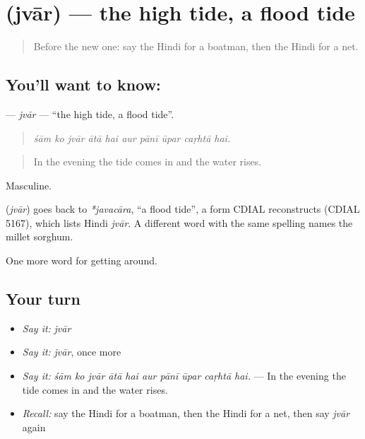 \section[\texorpdfstring{\hi{ज्वार} (jvār)}{ज्वार (jvār)}]{ (jvār) — the high tide, a flood tide}

\label{lesson:HI-C445-jvar}



\begin{quote}
Before the new one: say the Hindi for a boatman, then the Hindi for a net.
\end{quote}

\subsection*{You'll want to know: }
\textbf{} — \emph{jvār} — \textquotedblleft{}the high tide, a flood tide\textquotedblright{}.

\begin{quote}
         
\end{quote}

\begin{quote}
\emph{śām ko jvār ātā hai aur pānī ūpar caṛhtā hai.}
\end{quote}

\begin{quote}
In the evening the tide comes in and the water rises.
\end{quote}

Masculine.

\begin{cousinweb}
\textbf{} (\emph{jvār}) goes back to \emph{*javacāra}, \textquotedblleft{}a flood tide\textquotedblright{}, a form CDIAL reconstructs (CDIAL 5167), which lists Hindi \emph{jvār}. A different word with the same spelling names the millet sorghum.
\end{cousinweb}

\begin{grammarlens}[title={What you've built}]
One more word for getting around.
\end{grammarlens}

\subsection*{Your turn}
\begin{itemize}
\raggedright
  \item \emph{Say it:} \emph{jvār}
  \item \emph{Say it:} \emph{jvār}, once more
  \item \emph{Say it:} \emph{śām ko jvār ātā hai aur pānī ūpar caṛhtā hai.} — In the evening the tide comes in and the water rises.
  \item \emph{Recall:} say the Hindi for a boatman, then the Hindi for a net, then say \emph{jvār} again
\end{itemize}

